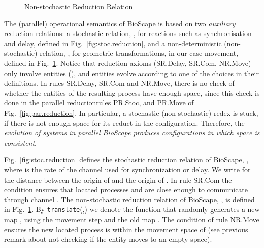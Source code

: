 \documentclass[submission,
copyright,
creativecommons
]{eptcs}
\newcommand{\rulename} [1] {{\sc #1}}
\newcommand{\mov}{\texttt{mov}}
\newcommand{\labRed}[1]{{\xrightarrow{#1}}}
\newcommand{\locP}[3]{\{#1\}_{#3}}
\begin{document}
\begin{figure}[tbp]
\footnotesize{
    }
  \vspace*{-0.6cm}
  \caption{Non-stochastic Reduction Relation}
\vspace*{-0.5cm}
  \label{fig.rednorate}
\end{figure}

The (parallel) operational semantics of BioScape is based on two {\em
  auxiliary} reduction
relations: a stochastic
relation, , for reactions such as
synchronisation and delay, defined in Fig.~\ref{fig:stoc.reduction}, and
a non-deterministic (non-stochastic) relation, , for
geometric transformations, in our case movement, defined in
Fig.~\ref{fig.rednorate}. Notice that reduction axioms (\rulename{SR.Delay, SR.Com, NR.Move}) only involve entities (), and entities evolve according to one of the choices  in their
definitions. In rules \rulename{SR.Delay, SR.Com} and
\rulename{NR.Move},  there is no  check of whether the entities of the
resulting process have enough space, since this check is done in the
parallel reductionrules \rulename{PR.Stoc}, and \rulename{PR.Move} of
Fig.~\ref{fig:par.reduction}. In particular, a stochastic
(non-stochastic) redex is stuck, if there is not enough space for its
reduct in the configuration. Therefore, the {\em evolution of systems in parallel BioScape  produces configurations in which space is consistent}.


Fig.~\ref{fig:stoc.reduction} defines the stochastic reduction
relation of BioScape, , where
 is the rate of the channel used for synchronization or delay.
 We write 
for the distance between the origin of
 and the origin of . In rule
\rulename{SR.Com} the condition 
ensures that located processes
 and  are close enough to communicate through
channel .
The non-stochastic reduction relation  of BioScape,
 , is defined in Fig.~\ref{fig.rednorate}.
By  \texttt{translate}(,) we denote the function that randomly generates a new
map , using the movement step  and the old
map . The condition  of rule \rulename{NR.Move}
ensures the new located process
 is within the movement space  of  (see previous remark about not checking if the entity moves to an empty space).
\end{document}
